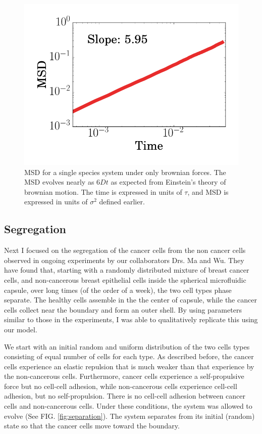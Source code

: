 \documentclass[aps,prb,twocolumn,groupedaddress,nofootinbib,floatfix]{revtex4}
\begin{document}
\begin{figure}
  \includegraphics[width=\columnwidth]{images/brownianMSD.png}
  \caption[brownianMSD]
    {MSD for a single species system under only brownian forces. The MSD evolves nearly as $6Dt$ as expected from Einstein's theory of brownian motion. The time is expressed in units of $\tau$, and MSD is expressed in units of $\sigma^2$ defined earlier.}
  \label{fig:brownianMSD}
\end{figure}

\subsection{Segregation}

Next I focused on the segregation of the cancer cells from the non cancer cells
observed in ongoing experiments by our collaborators Drs. Ma and Wu. 
They have found that, starting with a randomly distributed mixture of breast cancer cells,
and non-cancerous breast epithelial cells inside the spherical microfluidic capsule, over long times
(of the order of a week\cite{Lu}), the two cell types phase separate. The healthy cells assemble in the the center of capsule,
while the cancer cells collect near the boundary and form an outer shell. By using parameters similar to those 
in the experiments, I was able to qualitatively replicate this using our model.


We start with an initial random and uniform distribution of the two cells types consisting of  
equal number of cells for each type. As described before, the cancer cells experience an elastic
repulsion that is much weaker than that experience by the non-cancerous cells.
Furthermore, cancer cells experience a self-propulsive force but no cell-cell adhesion, while non-cancerous cells experience cell-cell adhesion, but no self-propulsion.
There is no cell-cell adhesion between cancer cells and non-cancerous cells.
Under these conditions, the system was allowed to evolve (See FIG. \ref{fig:separation}).
The system separates from its initial (random) state so that the cancer cells move toward the boundary.
\end{document}
